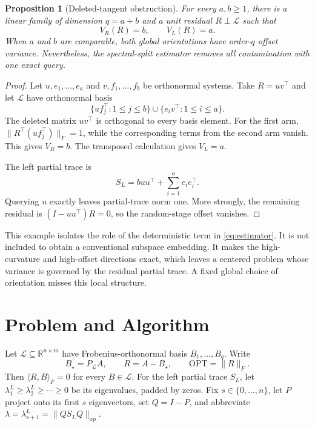 \documentclass[twoside]{article}
\newtheorem{proposition}[theorem]{Proposition}
\newcommand{\R}{\mathbb R}
\newcommand{\op}{\mathrm{op}}
\newcommand{\cL}{\mathcal L}
\newcommand{\OPT}{\mathrm{OPT}}
\begin{document}
\begin{proposition}[Deleted-tangent obstruction]
\label{prop:tangent}
For every $a,b\ge1$, there is a linear family of dimension $q=a+b$ and a unit residual $R\perp\cL$ such that \[ V_R(R)=b, \qquad V_L(R)=a. \] When $a$ and $b$ are comparable, both global orientations have order-$q$ offset variance. Nevertheless, the spectral-split estimator removes all contamination with one exact query.
\end{proposition}

\begin{proof}
Let $u,e_1,\ldots,e_a$ and $v,f_1,\ldots,f_b$ be orthonormal systems. Take $R=uv^\top$ and let $\cL$ have orthonormal basis
\begin{equation}
 \{uf_j^\top:1\le j\le b\}
 \mathbin\cup
 \{e_iv^\top:1\le i\le a\}.
 \label{eq:tangent-family}
\end{equation}
The deleted matrix $uv^\top$ is orthogonal to every basis element. For the first arm, $\|R^\top(uf_j^\top)\|_F=1$, while the corresponding terms from the second arm vanish. This gives $V_R=b$. The transposed calculation gives $V_L=a$.

The left partial trace is \[ S_L=buu^\top+\sum_{i=1}^ae_ie_i^\top. \] Querying $u$ exactly leaves partial-trace norm one. More strongly, the remaining residual is $(I-uu^\top)R=0$, so the random-stage offset vanishes.
\end{proof}

This example isolates the role of the deterministic term in \eqref{eq:estimator}. It is not included to obtain a conventional subspace embedding. It makes the high-curvature and high-offset directions exact, which leaves a centered problem whose variance is governed by the residual partial trace. A fixed global choice of orientation misses this local structure.

\section{Problem and Algorithm}
\label{sec:algorithm}

Let $\cL\subseteq\R^{n\times m}$ have Frobenius-orthonormal basis $B_1,\ldots,B_q$. Write \[ B_\star=P_{\cL}A, \qquad R=A-B_\star, \qquad \OPT=\|R\|_F. \] Then $\langle R,B\rangle_F=0$ for every $B\in\cL$. For the left partial trace $S_L$, let $\lambda_1^L\ge\lambda_2^L\ge\cdots\ge0$ be its eigenvalues, padded by zeros. Fix $s\in\{0,\ldots,n\}$, let $P$ project onto its first $s$ eigenvectors, set $Q=I-P$, and abbreviate $\lambda=\lambda_{s+1}^L=\|QS_LQ\|_\op$.
\end{document}
